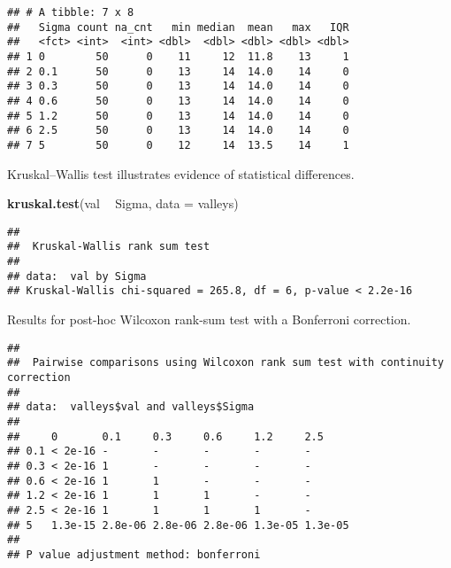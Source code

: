 \documentclass[]{book}
\newenvironment{Shaded}{\begin{snugshade}}{\end{snugshade}}
\newcommand{\DataTypeTok}[1]{\textcolor[rgb]{0.13,0.29,0.53}{#1}}
\newcommand{\KeywordTok}[1]{\textcolor[rgb]{0.13,0.29,0.53}{\textbf{#1}}}
\newcommand{\NormalTok}[1]{#1}
\newcommand{\OperatorTok}[1]{\textcolor[rgb]{0.81,0.36,0.00}{\textbf{#1}}}
\newcommand{\OtherTok}[1]{\textcolor[rgb]{0.56,0.35,0.01}{#1}}
\newcommand{\StringTok}[1]{\textcolor[rgb]{0.31,0.60,0.02}{#1}}
\begin{document}
\begin{verbatim}
## # A tibble: 7 x 8
##   Sigma count na_cnt   min median  mean   max   IQR
##   <fct> <int>  <int> <dbl>  <dbl> <dbl> <dbl> <dbl>
## 1 0        50      0    11     12  11.8    13     1
## 2 0.1      50      0    13     14  14.0    14     0
## 3 0.3      50      0    13     14  14.0    14     0
## 4 0.6      50      0    13     14  14.0    14     0
## 5 1.2      50      0    13     14  14.0    14     0
## 6 2.5      50      0    13     14  14.0    14     0
## 7 5        50      0    12     14  13.5    14     1
\end{verbatim}

Kruskal--Wallis test illustrates evidence of statistical differences.

\begin{Shaded}
\begin{Highlighting}[]
\KeywordTok{kruskal.test}\NormalTok{(val }\OperatorTok{~}\StringTok{ }\NormalTok{Sigma, }\DataTypeTok{data =}\NormalTok{ valleys)}
\end{Highlighting}
\end{Shaded}

\begin{verbatim}
## 
##  Kruskal-Wallis rank sum test
## 
## data:  val by Sigma
## Kruskal-Wallis chi-squared = 265.8, df = 6, p-value < 2.2e-16
\end{verbatim}

Results for post-hoc Wilcoxon rank-sum test with a Bonferroni correction.

\begin{Shaded}
\end{Shaded}

\begin{verbatim}
## 
##  Pairwise comparisons using Wilcoxon rank sum test with continuity correction 
## 
## data:  valleys$val and valleys$Sigma 
## 
##     0       0.1     0.3     0.6     1.2     2.5    
## 0.1 < 2e-16 -       -       -       -       -      
## 0.3 < 2e-16 1       -       -       -       -      
## 0.6 < 2e-16 1       1       -       -       -      
## 1.2 < 2e-16 1       1       1       -       -      
## 2.5 < 2e-16 1       1       1       1       -      
## 5   1.3e-15 2.8e-06 2.8e-06 2.8e-06 1.3e-05 1.3e-05
## 
## P value adjustment method: bonferroni
\end{verbatim}
\end{document}
